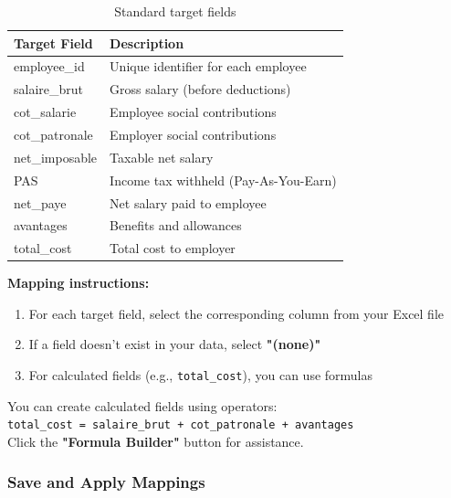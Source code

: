 \documentclass[11pt,a4paper]{article}
\begin{document}
\begin{table}[h]
\centering
\small
\begin{tabular}{@{} l p{7cm} @{}}
\toprule
\textbf{Target Field} & \textbf{Description} \\
\midrule
employee\_id & Unique identifier for each employee \\
salaire\_brut & Gross salary (before deductions) \\
cot\_salarie & Employee social contributions \\
cot\_patronale & Employer social contributions \\
net\_imposable & Taxable net salary \\
PAS & Income tax withheld (Pay-As-You-Earn) \\
net\_paye & Net salary paid to employee \\
avantages & Benefits and allowances \\
total\_cost & Total cost to employer \\
\bottomrule
\end{tabular}
\caption{Standard target fields}
\end{table}

\textbf{Mapping instructions:}

\begin{enumerate}[leftmargin=*]
    \item For each target field, select the corresponding column from your Excel file
    \item If a field doesn't exist in your data, select \textbf{"(none)"}
    \item For calculated fields (e.g., \texttt{total\_cost}), you can use formulas
\end{enumerate}

\begin{infobox}[title=Formula Support]
You can create calculated fields using operators:\\[0.2cm]
\texttt{total\_cost = salaire\_brut + cot\_patronale + avantages}\\[0.2cm]
Click the \textbf{"Formula Builder"} button for assistance.
\end{infobox}

\subsubsection{Save and Apply Mappings}
\end{document}
